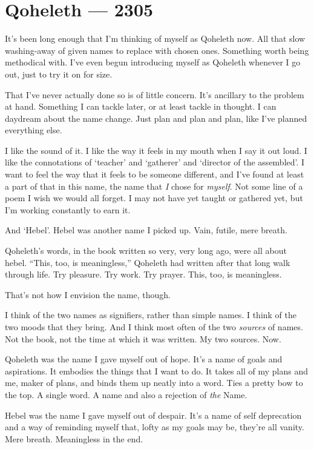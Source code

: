 \hypertarget{qoheleth-2305}{%
\chapter*{Qoheleth — 2305}\label{qoheleth-2305}}

It's been long enough that I'm thinking of myself as Qoheleth now. All that slow washing-away of given names to replace with chosen ones. Something worth being methodical with. I've even begun introducing myself as Qoheleth whenever I go out, just to try it on for size.

That I've never actually done so is of little concern. It's ancillary to the problem at hand. Something I can tackle later, or at least tackle in thought. I can daydream about the name change. Just plan and plan and plan, like I've planned everything else.

I like the sound of it. I like the way it feels in my mouth when I say it out loud. I like the connotations of `teacher' and `gatherer' and `director of the assembled'. I want to feel the way that it feels to be someone different, and I've found at least a part of that in this name, the name that \emph{I} chose for \emph{myself}. Not some line of a poem I wish we would all forget. I may not have yet taught or gathered yet, but I'm working constantly to earn it.

And `Hebel'. Hebel was another name I picked up. Vain, futile, mere breath.

Qoheleth's words, in the book written so very, very long ago, were all about hebel. ``This, too, is meaningless,'' Qoheleth had written after that long walk through life. Try pleasure. Try work. Try prayer. This, too, is meaningless.

That's not how I envision the name, though.

I think of the two names as signifiers, rather than simple names. I think of the two moods that they bring. And I think most often of the two \emph{sources} of names. Not the book, not the time at which it was written. My two sources. Now.

Qoheleth was the name I gave myself out of hope. It's a name of goals and aspirations. It embodies the things that I want to do. It takes all of my plans and me, maker of plans, and binds them up neatly into a word. Ties a pretty bow to the top. A single word. A name and also a rejection of \emph{the} Name.

Hebel was the name I gave myself out of despair. It's a name of self deprecation and a way of reminding myself that, lofty as my goals may be, they're all vanity. Mere breath. Meaningless in the end.

